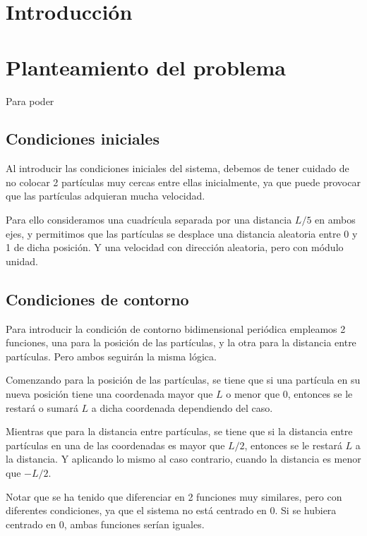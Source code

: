 \documentclass[11pt, twoside]{article} %
\begin{document}
\pagestyle{main}

\section{Introducción}

\section{Planteamiento del problema}

Para poder 

\subsection{Condiciones iniciales}
Al introducir las condiciones iniciales del sistema, debemos de tener cuidado de
no colocar 2 partículas muy cercas entre ellas inicialmente, ya que puede provocar
que las partículas adquieran mucha velocidad. 

Para ello consideramos una cuadrícula separada por una distancia $L/5$ en ambos 
ejes, y permitimos que las partículas se desplace una distancia aleatoria entre 0 y 1
de dicha posición. Y una velocidad con dirección aleatoria, pero con módulo unidad.

\subsection{Condiciones de contorno}

Para introducir la condición de contorno bidimensional periódica empleamos 
2 funciones, una para la posición de las partículas, y la otra para la 
distancia entre partículas. Pero ambos seguirán la misma lógica.

Comenzando para la posición de las partículas, se tiene que si una partícula en su
nueva posición tiene una coordenada mayor que $L$ o menor que 0, entonces se le 
restará o sumará $L$ a dicha coordenada dependiendo del caso. 

Mientras que para la distancia entre partículas, se tiene que si la distancia entre
partículas en una de las coordenadas es mayor que $L/2$, entonces se le restará 
$L$ a la distancia. Y aplicando lo mismo al caso contrario, cuando la distancia es
menor que $-L/2$.

Notar que se ha tenido que diferenciar en 2 funciones muy similares, pero con diferentes
condiciones, ya que el sistema no está centrado en 0. Si se hubiera centrado en 0, 
ambas funciones serían iguales.
\end{document}
